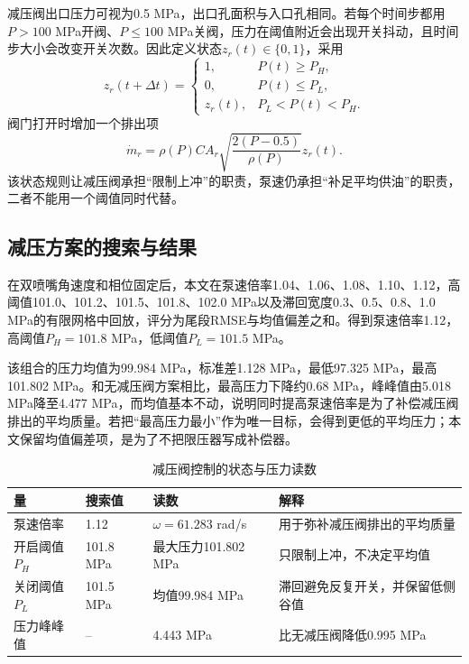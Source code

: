 \documentclass[UTF8,11pt,a4paper]{ctexart}
\begin{document}
减压阀出口压力可视为0.5 MPa，出口孔面积与入口孔相同。若每个时间步都用$P>100$ MPa开阀、$P\leq100$ MPa关阀，压力在阈值附近会出现开关抖动，且时间步大小会改变开关次数。因此定义状态$z_r(t)\in\{0,1\}$，采用
\begin{equation}
z_r(t+\Delta t)=
\begin{cases}
1,&P(t)\geq P_H,\\
0,&P(t)\leq P_L,\\
z_r(t),&P_L<P(t)<P_H.
\end{cases}
\label{eq:relief-hysteresis}
\end{equation}
阀门打开时增加一个排出项
\begin{equation}
\dot m_r=\rho(P) C A_r\sqrt{\frac{2(P-0.5)}{\rho(P)}}z_r(t).
\end{equation}
该状态规则让减压阀承担“限制上冲”的职责，泵速仍承担“补足平均供油”的职责，二者不能用一个阈值同时代替。

\subsection{减压方案的搜索与结果}

在双喷嘴角速度和相位固定后，本文在泵速倍率1.04、1.06、1.08、1.10、1.12，高阈值101.0、101.2、101.5、101.8、102.0 MPa以及滞回宽度0.3、0.5、0.8、1.0 MPa的有限网格中回放，评分为尾段RMSE与均值偏差之和。得到泵速倍率1.12，高阈值$P_H=101.8$ MPa，低阈值$P_L=101.5$ MPa。

该组合的压力均值为99.984 MPa，标准差1.128 MPa，最低97.325 MPa，最高101.802 MPa。和无减压阀方案相比，最高压力下降约0.68 MPa，峰峰值由5.018 MPa降至4.477 MPa，而均值基本不动，说明同时提高泵速倍率是为了补偿减压阀排出的平均质量。若把“最高压力最小”作为唯一目标，会得到更低的平均压力；本文保留均值偏差项，是为了不把限压器写成补偿器。

\begin{table}[H]
\centering
\caption{减压阀控制的状态与压力读数}
\label{tab:q3-relief}
\small
\begin{tabularx}{\textwidth}{p{3.1cm}p{3.2cm}p{3.0cm}X}
\toprule
量 & 搜索值 & 读数 & 解释\\
\midrule
泵速倍率 & 1.12 & $\omega=61.283$ rad/s & 用于弥补减压阀排出的平均质量\\
开启阈值$P_H$ & 101.8 MPa & 最大压力101.802 MPa & 只限制上冲，不决定平均值\\
关闭阈值$P_L$ & 101.5 MPa & 均值99.984 MPa & 滞回避免反复开关，并保留低侧谷值\\
压力峰峰值 & -- & 4.443 MPa & 比无减压阀降低0.995 MPa\\
\bottomrule
\end{tabularx}
\end{table}
\end{document}
